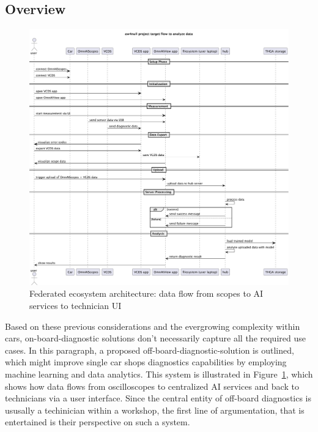 \documentclass[conference,a4paper]{IEEEtran}
\begin{document}
\subsection{Overview}
\begin{figure}[t]
  \centering
  \includegraphics[width=\textwidth]{figures/aw4null_project_target_flow_to_analyze_data.pdf}
  \caption{Federated ecosystem architecture: data flow from scopes to AI services to technician UI}
  \label{fig:system_architecture}
\end{figure}
Based on these previous considerations and the evergrowing complexity within cars, on-board-diagnostic solutions don't necessarily capture all the required use cases.
In this paragraph, a proposed off-board-diagnostic-solution is outlined, which might improve single car shops diagnostics capabilities by employing machine learning and data analytics. 
This system is illustrated in Figure~\ref{fig:system_architecture}, which shows how data flows from oscilloscopes to centralized AI services and back to technicians via a user interface.
Since the central entity of off-board diagnostics is ususally a techinician within a workshop, the first line of argumentation, that is entertained is their perspective on such a system.
\end{document}
